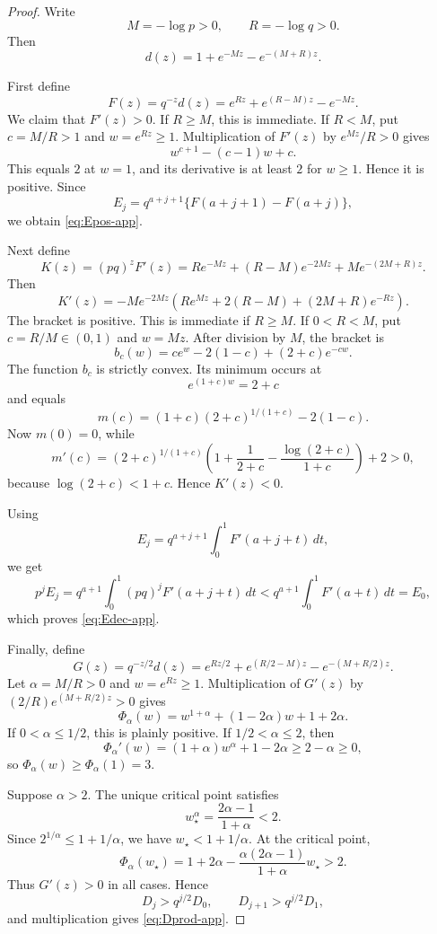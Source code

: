 \documentclass[11pt]{article}
\theoremstyle{plain}
\theoremstyle{definition}
\theoremstyle{remark}
\newcommand{\dd}{\,d}
\begin{document}
\begin{proof}
Write
\[
M=-\log p>0,
\qquad
R=-\log q>0.
\]
Then
\[
d(z)=1+e^{-Mz}-e^{-(M+R)z}.
\]

First define
\[
F(z)=q^{-z}d(z)
=e^{Rz}+e^{(R-M)z}-e^{-Mz}.
\]
We claim that \(F'(z)>0\).  If \(R\ge M\), this is immediate.  If \(R<M\), put \(c=M/R>1\) and \(w=e^{Rz}\ge1\).  Multiplication of \(F'(z)\) by \(e^{Mz}/R>0\) gives
\[
w^{c+1}-(c-1)w+c.
\]
This equals \(2\) at \(w=1\), and its derivative is at least \(2\) for \(w\ge1\).  Hence it is positive.  Since
\[
E_j=q^{a+j+1}\{F(a+j+1)-F(a+j)\},
\]
we obtain \eqref{eq:Epos-app}.

Next define
\[
K(z)=(pq)^zF'(z)
=R e^{-Mz}+(R-M)e^{-2Mz}+M e^{-(2M+R)z}.
\]
Then
\[
K'(z)
=-M e^{-2Mz}
\left(Re^{Mz}+2(R-M)+(2M+R)e^{-Rz}\right).
\]
The bracket is positive.  This is immediate if \(R\ge M\).  If \(0<R<M\), put \(c=R/M\in(0,1)\) and \(w=Mz\).  After division by \(M\), the bracket is
\[
b_c(w)=ce^w-2(1-c)+(2+c)e^{-cw}.
\]
The function \(b_c\) is strictly convex.  Its minimum occurs at
\[
e^{(1+c)w}=2+c
\]
and equals
\[
m(c)=(1+c)(2+c)^{1/(1+c)}-2(1-c).
\]
Now \(m(0)=0\), while
\[
m'(c)
=(2+c)^{1/(1+c)}
\left(1+\frac1{2+c}-\frac{\log(2+c)}{1+c}\right)+2>0,
\]
because \(\log(2+c)<1+c\).  Hence \(K'(z)<0\).

Using
\[
E_j=q^{a+j+1}\int_0^1F'(a+j+t)\dd t,
\]
we get
\[
p^jE_j
=q^{a+1}\int_0^1(pq)^jF'(a+j+t)\dd t
<q^{a+1}\int_0^1F'(a+t)\dd t
=E_0,
\]
which proves \eqref{eq:Edec-app}.

Finally, define
\[
G(z)=q^{-z/2}d(z)
=e^{Rz/2}+e^{(R/2-M)z}-e^{-(M+R/2)z}.
\]
Let \(\alpha=M/R>0\) and \(w=e^{Rz}\ge1\).  Multiplication of \(G'(z)\) by \((2/R)e^{(M+R/2)z}>0\) gives
\begin{equation}\label{eq:Phi-alpha-app}
\Phi_\alpha(w)
=w^{1+\alpha}+(1-2\alpha)w+1+2\alpha.
\end{equation}
If \(0<\alpha\le1/2\), this is plainly positive.  If \(1/2<\alpha\le2\), then
\[
\Phi_\alpha'(w)
=(1+\alpha)w^\alpha+1-2\alpha
\ge2-\alpha\ge0,
\]
so \(\Phi_\alpha(w)\ge\Phi_\alpha(1)=3\).

Suppose \(\alpha>2\).  The unique critical point satisfies
\[
w_\star^\alpha=\frac{2\alpha-1}{1+\alpha}<2.
\]
Since \(2^{1/\alpha}\le1+1/\alpha\), we have \(w_\star<1+1/\alpha\).  At the critical point,
\[
\Phi_\alpha(w_\star)
=1+2\alpha
-\frac{\alpha(2\alpha-1)}{1+\alpha}w_\star
>2.
\]
Thus \(G'(z)>0\) in all cases.  Hence
\[
D_j>q^{j/2}D_0,
\qquad
D_{j+1}>q^{j/2}D_1,
\]
and multiplication gives \eqref{eq:Dprod-app}.
\end{proof}
\end{document}
